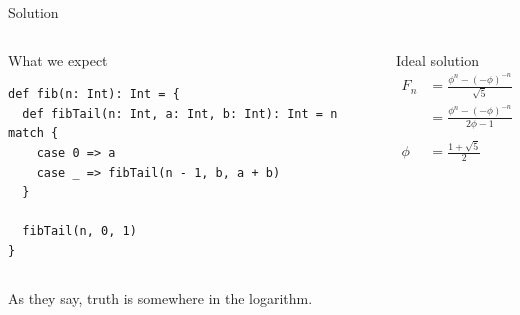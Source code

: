 \documentclass[presentation,aspectratio=169,smaller]{beamer}
\begin{document}
\begin{frame}[label={sec:org4a13e8d},fragile]{Solution}
 \begin{columns}
\begin{column}[t]{0.5\columnwidth}
\begin{block}{What we expect}
\begin{verbatim}
def fib(n: Int): Int = {
  def fibTail(n: Int, a: Int, b: Int): Int = n match {
    case 0 => a
    case _ => fibTail(n - 1, b, a + b)
  }

  fibTail(n, 0, 1)
}
\end{verbatim}

\pause
\end{block}
\end{column}

\begin{column}[t]{0.5\columnwidth}
\begin{block}{Ideal solution}
\begin{align*}
  F_n &= \frac {\phi ^ n - {(- \phi)}^{-n}} {\sqrt{5}} \\
  &= \frac {\phi ^ n - {(- \phi)}^{-n}} {2\phi - 1} \\
  \\
  \phi &= \frac {1 + \sqrt{5}}{2}
\end{align*}

\pause
\end{block}
\end{column}
\end{columns}

As they say, truth is somewhere in the logarithm.
\end{frame}
\end{document}
